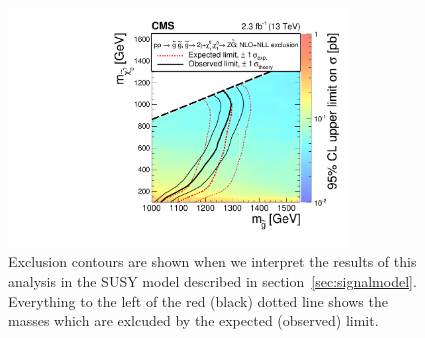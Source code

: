 \begin{figure}[!htb]
\begin{center}
\includegraphics[width=0.8\textwidth]{results/figs/T5ZZ_Exclusion_13TeV.pdf}
\caption{
  Exclusion contours are shown when we interpret the results of this analysis in the SUSY model described in section~\ref{sec:signalmodel}.
  Everything to the left of the red (black) dotted line shows the masses which are exlcuded by the expected (observed) limit.
\label{fig:results_T5ZZ}}
\end{center}
\end{figure}


\clearpage
